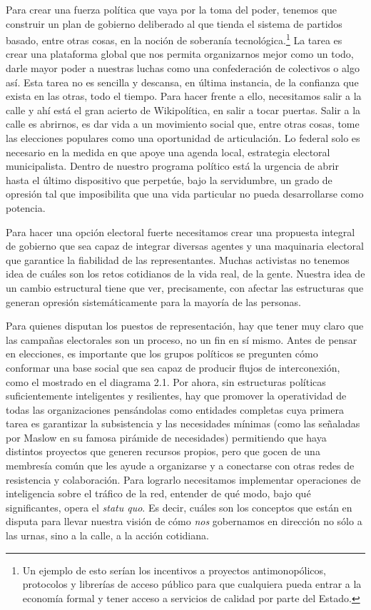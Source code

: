 Para crear una fuerza política que vaya por la toma del poder, tenemos que construir un plan de gobierno deliberado al que tienda el sistema de partidos basado, entre otras cosas, en la noción de soberanía tecnológica.\footnote{Un ejemplo de esto serían los incentivos a proyectos antimonopólicos, protocolos y librerías de acceso público para que cualquiera pueda entrar a la economía formal y tener acceso a servicios de calidad por parte del Estado.} La tarea es crear una plataforma global que nos permita organizarnos mejor como un todo, darle mayor poder a nuestras luchas como una confederación de colectivos o algo así. Esta tarea no es sencilla y descansa, en última instancia, de la confianza que exista en las otras, todo el tiempo. Para hacer frente a ello, necesitamos salir a la calle y ahí está el gran acierto de Wikipolítica, en salir a tocar puertas. Salir a la calle es abrirnos, es dar vida a un movimiento social que, entre otras cosas, tome las elecciones populares como una oportunidad de articulación. Lo federal solo es necesario en la medida en que apoye una agenda local, estrategia electoral municipalista. Dentro de nuestro programa político está la urgencia de abrir hasta el último dispositivo que perpetúe, bajo la servidumbre, un grado de opresión tal que imposibilita que una vida particular no pueda desarrollarse como potencia.

Para hacer una opción electoral fuerte necesitamos crear una propuesta integral de gobierno que sea capaz de integrar diversas agentes y una maquinaria electoral que garantice la fiabilidad de las representantes. Muchas activistas no tenemos idea de cuáles son los retos cotidianos de la vida real, de la gente. Nuestra idea de un cambio estructural tiene que ver, precisamente, con afectar las estructuras que generan opresión sistemáticamente para la mayoría de las personas.

Para quienes disputan los puestos de representación, hay que tener muy claro que las campañas electorales son un proceso, no un fin en sí mismo. Antes de pensar en elecciones, es importante que los grupos políticos se pregunten cómo conformar una base social que sea capaz de producir flujos de interconexión, como el mostrado en el diagrama 2.1. Por ahora, sin estructuras políticas suficientemente inteligentes y resilientes, hay que promover la operatividad de todas las organizaciones pensándolas como entidades completas cuya primera tarea es garantizar la subsistencia y las necesidades mínimas (como las señaladas por Maslow en su famosa pirámide de necesidades) permitiendo que haya distintos proyectos que generen recursos propios, pero que gocen de una membresía común que les ayude a organizarse y a conectarse con otras redes de resistencia y colaboración. Para lograrlo necesitamos implementar operaciones de inteligencia sobre el tráfico de la red, entender de qué modo, bajo qué significantes, opera el \emph{statu quo}. Es decir, cuáles son los conceptos que están en disputa para llevar nuestra visión de cómo \emph{nos} gobernamos en dirección no sólo a las urnas, sino a la calle, a la acción cotidiana.

